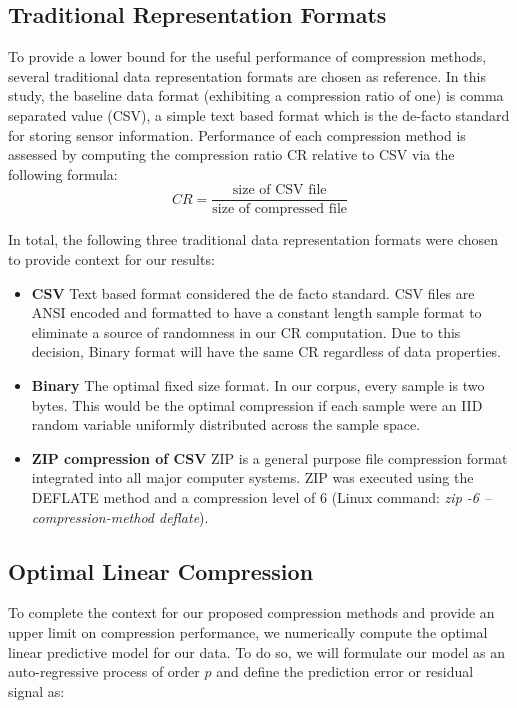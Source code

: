 \documentclass[journal]{IEEEtran}
\begin{document}
\subsection{Traditional Representation Formats}
To provide a lower bound for the useful performance of compression methods, several traditional data representation formats are chosen as reference. In this study, the baseline data format (exhibiting a compression ratio of one) is comma separated value (CSV), a simple text based format which is the de-facto standard for storing sensor information. Performance of each compression method is assessed by computing the compression ratio CR relative to CSV via the following formula:
$$CR = \frac{\textrm{size of CSV file}}{\textrm{size of compressed file}}$$

In total, the following three traditional data representation formats were chosen to provide context for our results:

\begin{itemize}
  \item \textbf{CSV} Text based format considered the de facto standard. CSV files are ANSI encoded and formatted to have a constant length sample format to eliminate a source of randomness in our CR computation. Due to this decision, Binary format will have the same CR regardless of data properties. 
  \item \textbf{Binary} The optimal fixed size format. In our corpus, every sample is two bytes. This would be the optimal compression if each sample were an IID random variable uniformly distributed across the sample space.
  \item \textbf{ZIP compression of CSV} ZIP is a general purpose file compression format integrated into all major computer systems. ZIP was executed using the DEFLATE method \cite{Deutsch1996} and a compression level of 6 (Linux command: \textit{zip -6 --compression-method deflate}).
\end{itemize}

\subsection{Optimal Linear Compression}

To complete the context for our proposed compression methods and provide an upper limit on compression performance, we numerically compute the optimal linear predictive model for our data. To do so, we will formulate our model as an auto-regressive process of order $p$ and define the prediction error or residual signal as:
\end{document}
